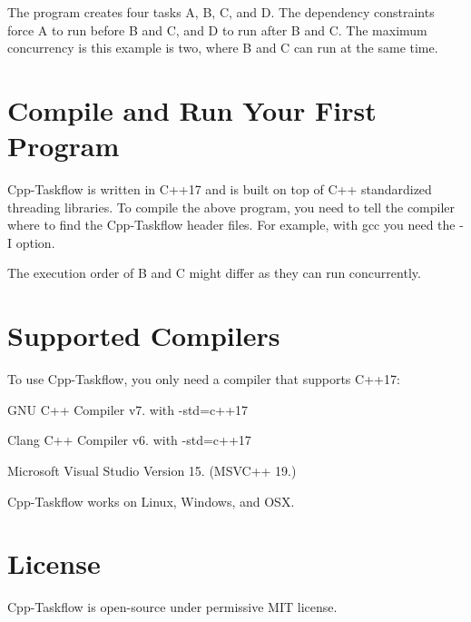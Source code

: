 The program creates four tasks A, B, C, and D. The dependency constraints force A to run before B and C, and D to run after B and C. The maximum concurrency is this example is two, where B and C can run at the same time.\hypertarget{index_CompileAndRunYourFirstProgram}{}\section{Compile and Run Your First Program}\label{index_CompileAndRunYourFirstProgram}
Cpp-\/\+Taskflow is written in C++17 and is built on top of C++ standardized threading libraries. To compile the above program, you need to tell the compiler where to find the Cpp-\/\+Taskflow header files. For example, with gcc you need the {\ttfamily -\/I} option.


\begin{DoxyCode}{0}
\end{DoxyCode}


The execution order of B and C might differ as they can run concurrently.\hypertarget{index_SupportedCompilers}{}\section{Supported Compilers}\label{index_SupportedCompilers}
To use Cpp-\/\+Taskflow, you only need a compiler that supports C++17\+:

\begin{DoxyItemize}
\item G\+NU C++ Compiler v7. with -\/std=c++17 \item Clang C++ Compiler v6. with -\/std=c++17 \item Microsoft Visual Studio Version 15. (M\+S\+V\+C++ 19.)\end{DoxyItemize}
Cpp-\/\+Taskflow works on Linux, Windows, and O\+SX.\hypertarget{index_License}{}\section{License}\label{index_License}
Cpp-\/\+Taskflow is open-\/source under permissive M\+IT license. 